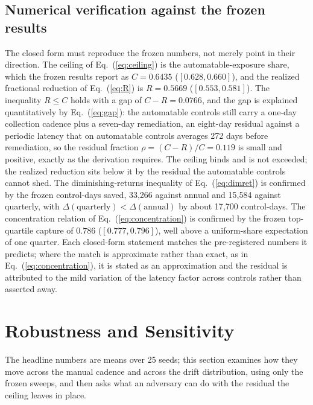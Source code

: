 \documentclass[journal]{IEEEtran}
\begin{document}
\subsection{Numerical verification against the frozen results}
The closed form must reproduce the frozen numbers, not merely point in their direction. The ceiling
of Eq.~(\ref{eq:ceiling}) is the automatable-exposure share, which the frozen results report as
$C = 0.6435$ ($[0.628, 0.660]$), and the realized fractional reduction of Eq.~(\ref{eq:R}) is
$R = 0.5669$ ($[0.553, 0.581]$). The inequality $R \le C$ holds with a gap of $C - R = 0.0766$, and
the gap is explained quantitatively by Eq.~(\ref{eq:gap}): the automatable controls still carry a
one-day collection cadence plus a seven-day remediation, an eight-day residual against a periodic
latency that on automatable controls averages 272 days before remediation, so the residual fraction
$\rho = (C - R)/C = 0.119$ is small and positive, exactly as the derivation requires. The ceiling
binds and is not exceeded; the realized reduction sits below it by the residual the automatable
controls cannot shed. The diminishing-returns inequality of Eq.~(\ref{eq:dimret}) is confirmed by
the frozen control-days saved, 33{,}266 against annual and 15{,}584 against quarterly, with
$\Delta(\text{quarterly}) < \Delta(\text{annual})$ by about 17{,}700 control-days. The concentration
relation of Eq.~(\ref{eq:concentration}) is confirmed by the frozen top-quartile capture of $0.786$
($[0.777, 0.796]$), well above a uniform-share expectation of one quarter. Each closed-form
statement matches the pre-registered numbers it predicts; where the match is approximate rather than
exact, as in Eq.~(\ref{eq:concentration}), it is stated as an approximation and the residual is
attributed to the mild variation of the latency factor across controls rather than asserted away.

\section{Robustness and Sensitivity}
\label{sec:robustness}
The headline numbers are means over 25 seeds; this section examines how they move across the manual
cadence and across the drift distribution, using only the frozen sweeps, and then asks what an
adversary can do with the residual the ceiling leaves in place.
\end{document}

